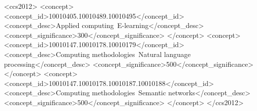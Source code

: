 \documentclass[sigconf]{acmart}
\begin{document}
\begin{CCSXML}
<ccs2012>
   <concept>
       <concept_id>10010405.10010489.10010495</concept_id>
       <concept_desc>Applied computing~E-learning</concept_desc>
       <concept_significance>300</concept_significance>
       </concept>
   <concept>
       <concept_id>10010147.10010178.10010179</concept_id>
       <concept_desc>Computing methodologies~Natural language processing</concept_desc>
       <concept_significance>500</concept_significance>
       </concept>
   <concept>
       <concept_id>10010147.10010178.10010187.10010188</concept_id>
       <concept_desc>Computing methodologies~Semantic networks</concept_desc>
       <concept_significance>500</concept_significance>
       </concept>
 </ccs2012>
\end{CCSXML}




\maketitle










\end{document}
